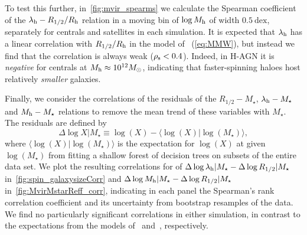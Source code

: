 \documentclass[useAMS,usenatbib]{mnras}
\begin{document}
To test this further, in~\cref{fig:mvir_spearms} we calculate the Spearman coefficient of the $\lambda_{\rm h}-R_{1/2}/R_{\rm h}$ relation in a moving bin of $\log M_{\rm h}$ of width $0.5~\mathrm{dex}$, separately for centrals and satellites in each simulation. It is expected that $\lambda_{\rm h}$ has a linear correlation with $R_{1/2}/R_{\rm h}$ in the model of~\citeauthor{MMW_1998} (\cref{eq:MMW}), but instead we find that the correlation is always weak ($\rho_{\rm s} < 0.4$). Indeed, in H-AGN it is \emph{negative} for centrals at $M_{\rm h} \approx 10^{12} M_\odot$, indicating that faster-spinning haloes host relatively \emph{smaller} galaxies.

Finally, we consider the correlations of the residuals of the $R_{1/2} - M_\star$, $\lambda_{\rm h} - M_\star$ and $M_{\rm h} - M_\star$ relations to remove the mean trend of these variables with $M_\star$. The residuals are defined by
\begin{equation}
    \Delta \log X|M_\star
    \equiv
    \log(X) - \langle \log(X)|\log(M_\star) \rangle,
\end{equation}
where $\langle \log(X)|\log(M_\star) \rangle$ is the expectation for $\log(X)$ at given $\log(M_\star)$ from fitting a shallow forest of decision trees on subsets of the entire data set.
We plot the resulting correlations for of $\Delta \log \lambda_{\rm h}|M_\star - \Delta \log R_{1/2}|M_\star$ in~\cref{fig:spin_galaxysizeCorr} and $\Delta \log M_{\rm h}|M_\star - \Delta \log R_{1/2}|M_\star$ in~\cref{fig:MvirMstarReff_corr}, indicating in each panel the Spearman's rank correlation coefficient and its uncertainty from bootstrap resamples of the data. We find no particularly significant correlations in either simulation, in contrast to the expectations from the models of~\citeauthor{MMW_1998} and~\citeauthor{Kravtsov_2013}, respectively.
\end{document}

